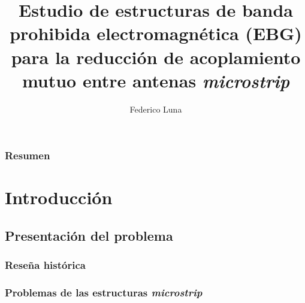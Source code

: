 \documentclass{beamer}
\title[Tesis de grado]{Estudio de estructuras de banda prohibida electromagnética (EBG) para la reducción de acoplamiento mutuo entre antenas \textit{microstrip}} %
\author{Federico Luna} %
\institute[] %
{
Facultad de Ingeniería,\\
Universidad de Buenos Aires \\ %
\medskip
\textit{fluna@fi.uba.ar}\\
\medskip %
Tutores: Dr. Ing. W. Gustavo Fano y Mg. Ing. Silvina Boggi
}
\date{} %
\begin{document}
\begin{frame}
\titlepage %
\end{frame}

\begin{frame}
\frametitle{Resumen} %
\tableofcontents %
\end{frame}


\section{Introducción} %

	\subsection{Presentación del problema} %
	
		\begin{frame}
		\frametitle{Reseña histórica}
		\end{frame}
		
		\begin{frame}
		\frametitle{Problemas de las estructuras \textit{microstrip}}
		\end{frame}
		
\end{document}
